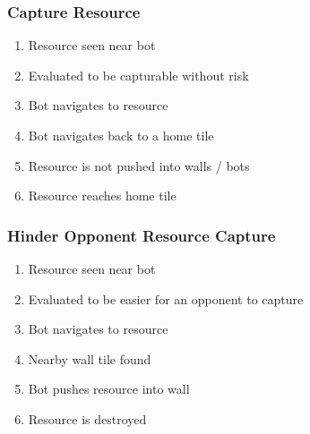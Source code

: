 \documentclass[a4paper,10pt]{article}
\begin{document}
\vspace{3mm}
\noindent
\begin{minipage}[t]{0.5\textwidth}
\subsubsection{Capture Resource}
\begin{enumerate}
\item Resource seen near bot
\item Evaluated to be capturable without risk
\item Bot navigates to resource
\item Bot navigates back to a home tile
\item Resource is not pushed into walls / bots
\item Resource reaches home tile
\end{enumerate}
\end{minipage}%
\begin{minipage}[t]{0.5\textwidth}
\subsubsection{Hinder Opponent Resource Capture}
\begin{enumerate}
\item Resource seen near bot
\item Evaluated to be easier for an opponent to capture
\item Bot navigates to resource
\item Nearby wall tile found
\item Bot pushes resource into wall
\item Resource is destroyed
\end{enumerate}
\end{minipage}
\end{document}

